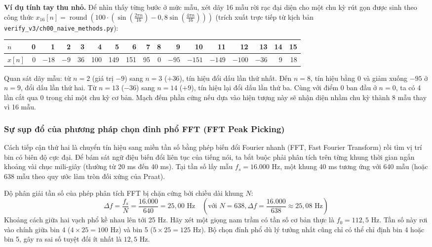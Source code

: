 \textbf{Ví dụ tính tay thu nhỏ.} Để nhìn thấy từng bước ở mức mẫu, xét dãy 16 mẫu rời rạc đại diện cho một chu kỳ rút gọn được sinh theo công thức $x_{16}[n] = \operatorname{round}\left(100 \cdot \left(\sin\left(\frac{2\pi n}{16}\right) - 0{,}8 \sin\left(\frac{4\pi n}{16}\right)\right)\right)$ (trích xuất trực tiếp từ kịch bản \texttt{verify\_v3/ch00\_naive\_methods.py}):
\begin{center}
\small
\begin{tabular}{lrrrrrrrrrrrrrrrr}
\toprule
$n$ & 0 & 1 & 2 & 3 & 4 & 5 & 6 & 7 & 8 & 9 & 10 & 11 & 12 & 13 & 14 & 15 \\
\midrule
$x[n]$ & 0 & $-18$ & $-9$ & 36 & 100 & 149 & 151 & 95 & 0 & $-95$ & $-151$ & $-149$ & $-100$ & $-36$ & 9 & 18 \\
\bottomrule
\end{tabular}
\end{center}
Quan sát dãy mẫu: từ $n=2$ (giá trị $-9$) sang $n=3$ ($+36$), tín hiệu đổi dấu lần thứ nhất. Đến $n=8$, tín hiệu bằng 0 và giảm xuống $-95$ ở $n=9$, đổi dấu lần thứ hai. Từ $n=13$ ($-36$) sang $n=14$ ($+9$), tín hiệu lại đổi dấu lần thứ ba. Cùng với điểm 0 ban đầu ở $n=0$, ta có 4 lần cắt qua 0 trong chỉ một chu kỳ cơ bản. Mạch đếm phần cứng nếu dựa vào hiện tượng này sẽ nhận diện nhầm chu kỳ thành 8 mẫu thay vì 16 mẫu.

\subsubsection*{Sự sụp đổ của phương pháp chọn đỉnh phổ FFT (FFT Peak Picking)}
Cách tiếp cận thứ hai là chuyển tín hiệu sang miền tần số bằng phép biến đổi Fourier nhanh (FFT, Fast Fourier Transform) rồi tìm vị trí bin có biên độ cực đại. Để bám sát ngữ điệu biến đổi liên tục của tiếng nói, ta bắt buộc phải phân tích trên từng khung thời gian ngắn khoảng vài chục mili-giây (thường từ 20 ms đến 40 ms). Tại tần số lấy mẫu $f_s = 16.000\text{ Hz}$, một khung 40 ms tương ứng với 640 mẫu (hoặc 638 mẫu theo quy ước làm tròn đối xứng của Praat).

Độ phân giải tần số của phép phân tích FFT bị chặn cứng bởi chiều dài khung $N$:
\begin{equation}
\Delta f = \frac{f_s}{N} = \frac{16.000}{640} = 25{,}00\text{ Hz} \quad (\text{với } N=638, \Delta f = \frac{16.000}{638} \approx 25{,}08\text{ Hz})
\end{equation}
Khoảng cách giữa hai vạch phổ kề nhau lên tới 25 Hz. Hãy xét một giọng nam trầm có tần số cơ bản thực là $f_0 = 112{,}5\text{ Hz}$. Tần số này rơi vào chính giữa bin 4 ($4 \times 25 = 100\text{ Hz}$) và bin 5 ($5 \times 25 = 125\text{ Hz}$). Bộ chọn đỉnh phổ dù lý tưởng nhất cũng chỉ có thể chỉ định bin 4 hoặc bin 5, gây ra sai số tuyệt đối ít nhất là $12{,}5\text{ Hz}$.

